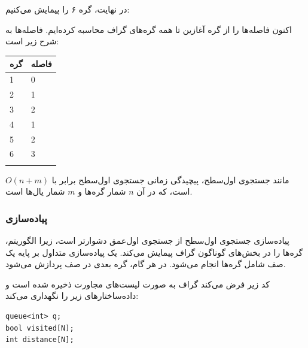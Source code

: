 در نهایت، گره ۶ را پیمایش می‌کنیم:
\begin{center}
\end{center}
اکنون فاصله‌ها را از گره آغازین تا همه گره‌های گراف محاسبه کرده‌ایم.
فاصله‌ها به شرح زیر است:

\begin{tabular}{ll}
\\
گره & فاصله \\
\hline
1 & 0 \\
2 & 1 \\
3 & 2 \\
4 & 1 \\
5 & 2 \\
6 & 3 \\
\\
\end{tabular}

مانند جستجوی اول‌سطح، پیچیدگی زمانی جستجوی اول‌سطح
برابر با $O(n+m)$ است، که در آن $n$ شمار گره‌ها
و $m$ شمار یال‌ها است.

\subsubsection*{پیاده‌سازی}

پیاده‌سازی جستجوی اول‌سطح از جستجوی اول‌عمق دشوارتر است،
زیرا الگوریتم، گره‌ها را در بخش‌های گوناگون گراف پیمایش می‌کند.
یک پیاده‌سازی متداول بر پایه یک صف شامل گره‌ها انجام می‌شود.
در هر گام، گره بعدی در صف پردازش می‌شود.

کد زیر فرض می‌کند گراف به صورت لیست‌های مجاورت ذخیره شده است
و داده‌ساختارهای زیر را نگهداری می‌کند:
\begin{lstlisting}
queue<int> q;
bool visited[N];
int distance[N];
\end{lstlisting}


